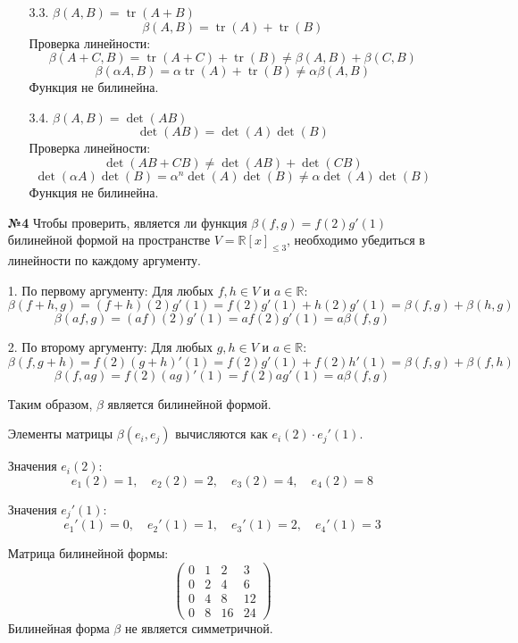 \documentclass[a4paper]{article}
\begin{document}
\begin{enumerate}
\begin{enumerate}
        \item[3.3.]\( \beta(A, B) = \operatorname{tr}(A + B) \) 
        \[\beta(A, B) = \operatorname{tr}(A) + \operatorname{tr}(B)\]  
        Проверка линейности:  
        \[\beta(A + C, B) = \operatorname{tr}(A + C) + \operatorname{tr}(B) 
        \neq \beta(A, B) + \beta(C, B)\] 
        \[\beta(\alpha A, B) = \alpha \operatorname{tr}(A) + \operatorname{tr}(B) 
        \neq \alpha \beta(A, B)\] 
        Функция не билинейна.  

        \item[3.4.]\( \beta(A, B) = \det(AB) \) 
        \[\det(AB) = \det(A) \det(B)\]
        Проверка линейности:  
        \[\det(AB + CB) \neq \det(AB) + \det(CB)\]  
        \[\det(\alpha A) \det(B) = \alpha^n \det(A) \det(B) 
        \neq \alpha \det(A) \det(B)\]
        Функция не билинейна.  
    \end{enumerate}

    \item[\textbf{№4}]Чтобы проверить, является ли функция 
    \( \beta(f, g) = f(2) g'(1) \) 
    билинейной формой на пространстве 
    \( V = \mathbb{R}[x]_{\leqslant 3} \), 
    необходимо убедиться в линейности по каждому аргументу. 

    1. По первому аргументу:
    Для любых \( f, h \in V \) и \( a \in \mathbb{R} \):
    \[ \beta(f + h, g) = (f + h)(2) g'(1) = f(2) g'(1) + h(2) g'(1) = 
    \beta(f, g) + \beta(h, g) \]
    \[ \beta(af, g) = (af)(2) g'(1) = a f(2) g'(1) = a \beta(f, g) \]

    2. По второму аргументу: Для любых \( g, h \in V \) и \( a \in \mathbb{R} \):
   \[ \beta(f, g + h) = f(2) (g + h)'(1) = f(2) g'(1) + f(2) h'(1) = 
   \beta(f, g) + \beta(f, h) \]
   \[ \beta(f, ag) = f(2) (ag)'(1) = f(2) a g'(1) = a \beta(f, g) \]

    
    Таким образом, \( \beta \) является билинейной формой.

    Элементы матрицы \( \beta(e_i, e_j) \) вычисляются как \( e_i(2) \cdot e_j'(1) \).

    Значения \( e_i(2) \):
    \[e_1(2) = 1, \quad e_2(2) = 2, \quad e_3(2) = 4, \quad e_4(2) = 8 \]

    Значения \( e_j'(1) \):
    \[ e_1'(1) = 0,\quad e_2'(1) = 1, \quad e_3'(1) = 2, \quad e_4'(1) = 3 \]

    Матрица билинейной формы:
    \[
    \begin{pmatrix}
    0 & 1 & 2 & 3 \\
    0 & 2 & 4 & 6 \\
    0 & 4 & 8 & 12 \\
    0 & 8 & 16 & 24
    \end{pmatrix}
    \]
    Билинейная форма \( \beta \) не является симметричной.\\


\end{enumerate}
\end{document}
